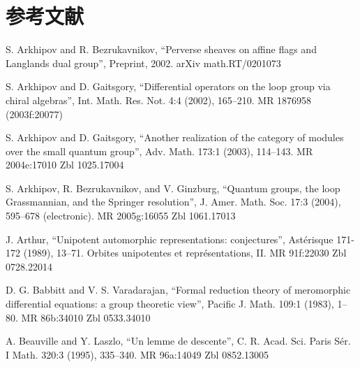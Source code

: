 
\chapter*{参考文献}

\par{} S. Arkhipov and R. Bezrukavnikov, ``Perverse sheaves on affine flags and Langlands dual group'', Preprint, 2002. arXiv math.RT/0201073

\par{} S. Arkhipov and D. Gaitsgory, ``Differential operators on the loop group via chiral algebras'', Int. Math. Res. Not. 4:4 (2002), 165--210. MR 1876958 (2003f:20077)

\par{} S. Arkhipov and D. Gaitsgory, ``Another realization of the category of modules over the small quantum group'', Adv. Math. 173:1 (2003), 114--143. MR 2004e:17010 Zbl 1025.17004

\par\noindent [Arkhipov et al. 2004] S. Arkhipov, R. Bezrukavnikov, and V. Ginzburg, ``Quantum groups, the loop Grassmannian, and the Springer resolution'', J. Amer. Math. Soc. 17:3 (2004), 595--678 (electronic). MR 2005g:16055 Zbl 1061.17013

\par\noindent [Arthur 1989] J. Arthur, ``Unipotent automorphic representations: conjectures'', Ast\'erisque 171-172 (1989), 13--71. Orbites unipotentes et repr\'esentations, II. MR 91f:22030 Zbl 0728.22014

\par{} D. G. Babbitt and V. S. Varadarajan, ``Formal reduction theory of meromorphic differential equations: a group theoretic view'', Pacific J. Math. 109:1 (1983), 1--80. MR 86b:34010 Zbl 0533.34010

\par{} A. Beauville and Y. Laszlo, ``Un lemme de descente'', C. R. Acad. Sci. Paris S\'er. I Math. 320:3 (1995), 335--340. MR 96a:14049 Zbl 0852.13005

